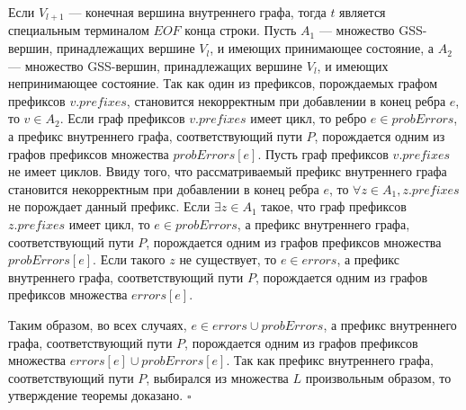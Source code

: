 Если $V_{l+1}$ --- конечная вершина внутреннего графа, тогда $t$ является специальным терминалом $EOF$ конца строки. Пусть $A_{1}$ --- множество GSS-вершин, принадлежащих вершине $V_{l}$, и имеющих принимающее состояние, а $A_{2}$ --- множество GSS-вершин, принадлежащих вершине $V_{l}$, и имеющих непринимающее состояние. Так как один из префиксов, порождаемых графом префиксов $v.prefixes$, становится некорректным при добавлении в конец ребра $e$, то $v \in A_{2}$. Если граф префиксов $v.prefixes$ имеет цикл, то ребро $e \in probErrors$, а префикс внутреннего графа, соответствующий пути $P$, порождается одним из графов префиксов множества $probErrors[e]$. Пусть граф префиксов $v.prefixes$ не имеет циклов. Ввиду того, что рассматриваемый префикс внутреннего графа становится некорректным при добавлении в конец ребра $e$, то $\forall z \in A_{1}, z.prefixes$ не порождает данный префикс. Если $\exists z \in A_{1}$ такое, что граф префиксов $z.prefixes$ имеет цикл, то $e \in probErrors$, а префикс внутреннего графа, соответствующий пути $P$, порождается одним из графов префиксов множества $probErrors[e]$. Если такого $z$ не существует, то $e \in errors$, а префикс внутреннего графа, соответствующий пути $P$, порождается одним из графов префиксов множества $errors[e]$.

Таким образом, во всех случаях,  $e \in errors \cup probErrors$, а префикс внутреннего графа, соответствующий пути $P$, порождается одним из графов префиксов множества $errors[e] \cup probErrors[e]$. Так как префикс внутреннего графа, соответствующий пути $P$, выбирался из множества $L$ произвольным образом, то утверждение теоремы доказано.
$\square$
